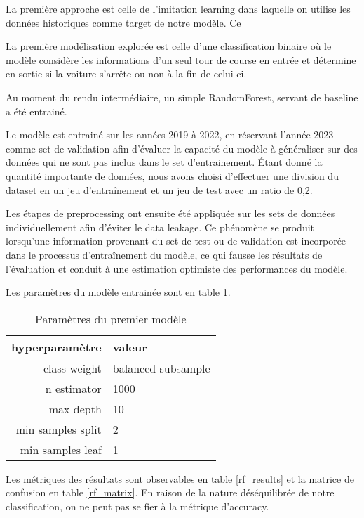 La première approche est celle de l'imitation learning dans laquelle on utilise les données historiques comme target de notre modèle.
Ce

La première modélisation explorée est celle d'une classification binaire
où le modèle considère les informations d'un seul tour de course en entrée et détermine en sortie si la voiture s'arrête ou non à la fin de celui-ci.

Au moment du rendu intermédiaire, un simple RandomForest, servant de baseline a été entrainé.

Le modèle est entrainé sur les années 2019 à 2022, en réservant l'année 2023 comme set de validation afin d'évaluer la capacité du modèle à généraliser
sur des données qui ne sont pas inclus dans le set d'entrainement.
Étant donné la quantité importante de données, nous avons choisi d'effectuer une division du dataset en un jeu d'entraînement et un jeu de test avec un ratio de 0,2.

Les étapes de preprocessing ont ensuite été appliquée sur les sets de données individuellement afin d'éviter le data leakage.
Ce phénomène se produit lorsqu'une information provenant du set de test ou de validation est incorporée dans le processus d'entraînement du modèle,
ce qui fausse les résultats de l'évaluation et conduit à une estimation optimiste des performances du modèle.

Les paramètres du modèle entrainée sont en table \ref{rf_params}.

\begin{table}[H]
    \begin{center}
        \caption{\label{rf_params}Paramètres du premier modèle}
        \begin{tabular}{r|l}
            hyperparamètre    & valeur             \\ \hline
            class weight      & balanced subsample \\
            n estimator       & 1000               \\
            max depth         & 10                 \\
            min samples split & 2                  \\
            min samples leaf  & 1                  \\
        \end{tabular}
    \end{center}
\end{table}

Les métriques des résultats sont observables en table \ref{rf_results} et la matrice de confusion en table \ref{rf_matrix}.
En raison de la nature déséquilibrée de notre classification, on ne peut pas se fier à la métrique d'accuracy.

